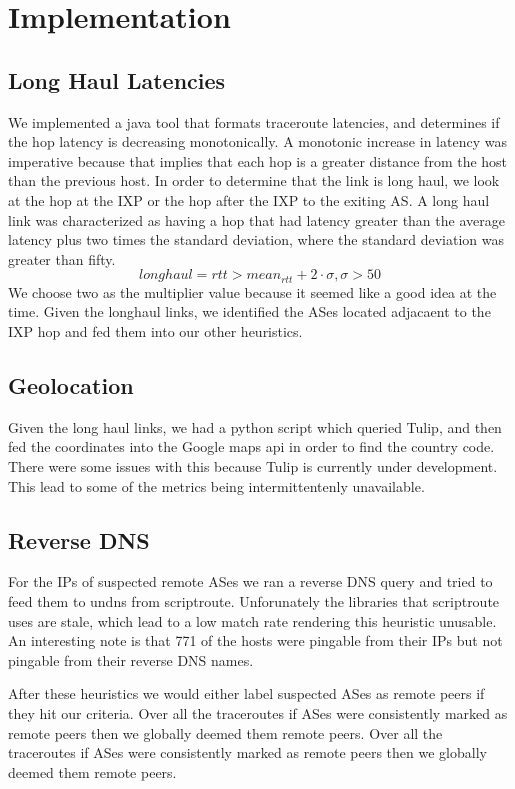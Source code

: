 \documentclass{acm_proc_article-sp}
\begin{document}
\section{Implementation}
\subsection{Long Haul Latencies}
We implemented a java tool that formats traceroute latencies, and determines if the hop latency is decreasing monotonically.
A monotonic increase in latency was imperative because that implies that each hop is a greater distance from the host than the previous host.
In order to determine that the link is long haul, we look at the hop at the IXP or the hop after the IXP to the exiting AS.
A long haul link was characterized as having a hop that had latency greater than the average latency plus two times the standard deviation, where the 
standard deviation was greater than fifty.
$$ longhaul = rtt > mean_{rtt} + 2\cdot \sigma, \sigma > 50$$
We choose two as the multiplier value because it seemed like a good idea at the time. Given the longhaul links, we identified the ASes located adjacaent to the IXP hop and fed them into our 
other heuristics.
\subsection{Geolocation}
Given the long haul links, we had a python script which queried Tulip, and then fed the coordinates into the Google maps api in order to find the country code.
There were some issues with this because Tulip is currently under development. This lead to some of the metrics being intermittentenly unavailable.
\subsection{Reverse DNS}
For the IPs of suspected remote ASes we ran a reverse DNS query and tried to feed them to undns from scriptroute.
Unforunately the libraries that scriptroute uses are stale, which lead to a low match rate rendering this heuristic unusable.
An interesting note is that 771 of the hosts were pingable from their IPs but not pingable from their reverse DNS names.


After these heuristics we would either label suspected ASes as remote peers if they hit our criteria. Over all the traceroutes if ASes were consistently marked as remote peers then we globally deemed them remote peers. Over all the traceroutes if ASes were consistently marked as remote peers then we globally deemed them remote peers.
\end{document}
